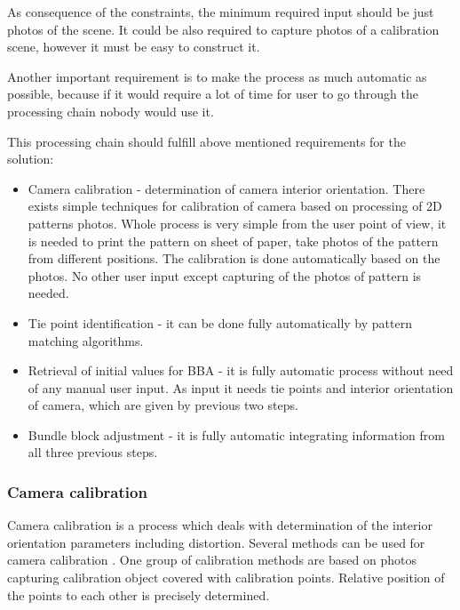 \documentclass[a4paper,12pt]{article}
\begin{document}
As consequence of the constraints, the minimum required input should be just photos
of the scene.
It could be also required to capture photos of a calibration scene, however 
it must be easy to construct it. 

Another important requirement is to make the process as much automatic as possible, because 
if it would require a lot of time for user to go through the processing chain nobody would use it.

This processing chain  \cite{labe2006automatic} should fulfill above mentioned requirements for the solution:

\begin{itemize}
\item Camera calibration - determination of camera interior orientation. There exists simple techniques for calibration
of camera based on processing of 2D patterns photos. Whole process is very simple from the user point of view, it is needed 
to print the pattern on sheet of paper, take photos of the pattern from different positions. The calibration 
is done automatically based on the photos. No other user input except  capturing of the photos of pattern is needed.
\item Tie point identification - it can be done fully automatically by pattern matching algorithms.
\item Retrieval of initial values for BBA - it is fully automatic process without need of any manual user input.
As input it needs tie points and interior orientation of camera, which are given by previous two steps.
\item Bundle block adjustment - it is fully automatic integrating information from all three previous steps.
\end{itemize}
 
 
 
\subsubsection{Camera calibration}


Camera calibration is a process which deals with determination of the interior orientation parameters including distortion.
Several methods can be used for camera calibration \cite{zhang2004calibration}. 
One group of calibration methods are based on photos capturing calibration object covered with calibration points.
Relative position of the points to each other is  precisely determined.  
\end{document}
